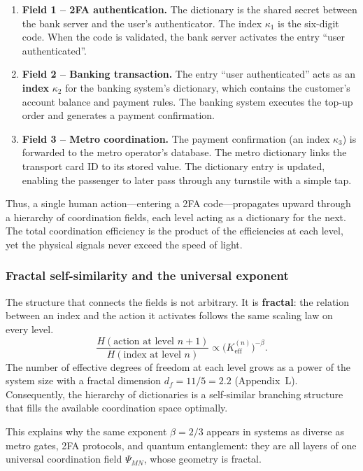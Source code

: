 \documentclass[12pt,a4paper]{article}
\theoremstyle{remark}
\begin{document}
	\begin{enumerate}[leftmargin=*]
		\item \textbf{Field 1 -- 2FA authentication.}
		The dictionary is the shared secret between the bank server and the
		user's authenticator.  The index $\kappa_1$ is the six-digit code.
		When the code is validated, the bank server activates the entry
		``user authenticated''.
		
		\item \textbf{Field 2 -- Banking transaction.}
		The entry ``user authenticated'' acts as an \textbf{index}
		$\kappa_2$ for the banking system's dictionary, which contains the
		customer's account balance and payment rules.  The banking system
		executes the top-up order and generates a payment confirmation.
		
		\item \textbf{Field 3 -- Metro coordination.}
		The payment confirmation (an index $\kappa_3$) is forwarded to the
		metro operator's database.  The metro dictionary links the
		transport card ID to its stored value.  The dictionary entry is
		updated, enabling the passenger to later pass through any turnstile
		with a simple tap.
	\end{enumerate}
	
	Thus, a single human action---entering a 2FA code---propagates upward
	through a hierarchy of coordination fields, each level acting as a
	dictionary for the next.  The total coordination efficiency is the
	product of the efficiencies at each level, yet the physical signals
	never exceed the speed of light.
	
	\subsubsection{Fractal self-similarity and the universal exponent}
	
	The structure that connects the fields is not arbitrary.  It is
	\textbf{fractal}: the relation between an index and the action it
	activates follows the same scaling law on every level.
	\[
	\frac{H(\text{action at level } n+1)}{H(\text{index at level } n)}
	\propto \bigl(K_{\mathrm{eff}}^{(n)}\bigr)^{-\beta}.
	\]
	The number of effective degrees of freedom at each level grows as a
	power of the system size with a fractal dimension $d_f = 11/5 = 2.2$
	(Appendix~L).  Consequently, the hierarchy of dictionaries is a
	self-similar branching structure that fills the available coordination
	space optimally.
	
	This explains why the same exponent $\beta=2/3$ appears in systems as
	diverse as metro gates, 2FA protocols, and quantum entanglement: they
	are all layers of one universal coordination field $\Psi_{MN}$, whose
	geometry is fractal.
	
\end{document}
